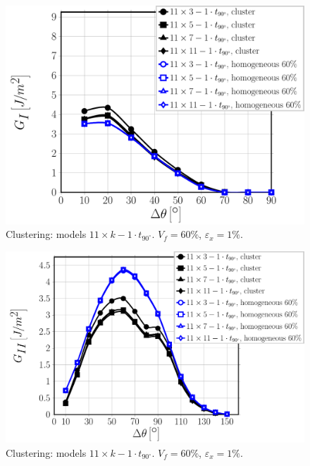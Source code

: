 \documentclass[review]{elsarticle}
\begin{document}
\begin{figure}[!h]
\centering
\includegraphics[width=\textwidth]{11xk-1t90-vf60-GI.pdf}
\caption{Clustering: models $11\times k-1\cdot t_{90^{\circ}}$. $V_{f}=60\%$, $\varepsilon_{x}=1\%$.}\label{fig:debonddebondGI}
\end{figure}

\begin{figure}[!h]
\centering
\includegraphics[width=\textwidth]{11xk-1t90-vf60-GII.pdf}
\caption{Clustering: models $11\times k-1\cdot t_{90^{\circ}}$. $V_{f}=60\%$, $\varepsilon_{x}=1\%$.}\label{fig:debonddebondGI}
\end{figure}
\end{document}
